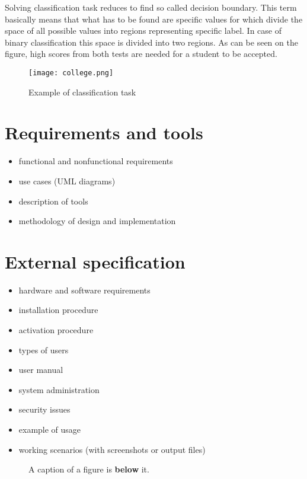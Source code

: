 \documentclass[a4paper,twoside,12pt]{book}
\begin{document}
Solving classification task reduces to find so called decision boundary. This term basically means that what has to be found are specific values for which divide the space of all possible values into regions representing specific label. In case of binary classification this space is divided into two regions.
As can be seen on the figure, high scores from both tests are needed for a student to be accepted.

\begin{figure}[h]
    \centering
    \texttt{[image: college.png]}
    \caption{Example of classification task}
    \label{fig:mesh1}
\end{figure}





\chapter{Requirements and tools}

\begin{itemize}
\item functional and nonfunctional requirements
\item use cases (UML diagrams)
\item description of tools
\item methodology of design and implementation
\end{itemize}


\chapter{External specification}
\begin{itemize}
\item hardware and software requirements
\item installation procedure
\item activation procedure
\item types of users
\item user manual
\item system administration
\item security issues
\item example of usage
\item working scenarios (with screenshots or output files)
\end{itemize}

\begin{figure}
\centering
{}
\caption{A caption of a figure is \textbf{below} it.}
\label{fig:2}
\end{figure}
\end{document}
